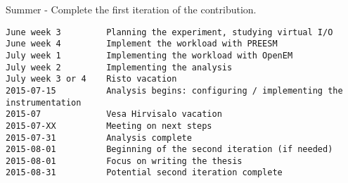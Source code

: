 \begin{samepage}
Summer - Complete the first iteration of the contribution.
\begin{verbatim}
June week 3         Planning the experiment, studying virtual I/O
June week 4         Implement the workload with PREESM
July week 1         Implementing the workload with OpenEM
July week 2         Implementing the analysis
July week 3 or 4    Risto vacation
2015-07-15          Analysis begins: configuring / implementing the instrumentation
2015-07             Vesa Hirvisalo vacation
2015-07-XX          Meeting on next steps
2015-07-31          Analysis complete
2015-08-01          Beginning of the second iteration (if needed)
2015-08-01          Focus on writing the thesis
2015-08-31          Potential second iteration complete
\end{verbatim}
\end{samepage}